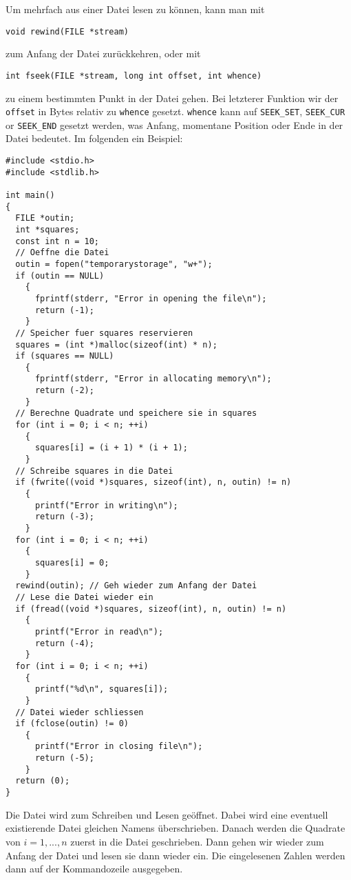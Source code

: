 Um mehrfach aus einer Datei lesen zu können, kann man mit 
\begin{lstlisting}
void rewind(FILE *stream)
\end{lstlisting}
zum Anfang der Datei zurückkehren, oder mit
\begin{lstlisting}
int fseek(FILE *stream, long int offset, int whence)
\end{lstlisting}
zu einem bestimmten Punkt in der Datei gehen.
Bei letzterer Funktion wir der \verb|offset| in Bytes relativ zu \verb|whence| gesetzt.
\verb|whence| kann auf \verb|SEEK_SET|, \verb|SEEK_CUR| or \verb|SEEK_END| gesetzt werden, was Anfang, momentane Position oder Ende in der Datei bedeutet.
Im folgenden ein Beispiel:
\begin{lstlisting}
#include <stdio.h>
#include <stdlib.h>

int main()
{
  FILE *outin;
  int *squares;
  const int n = 10;
  // Oeffne die Datei
  outin = fopen("temporarystorage", "w+");
  if (outin == NULL)
    {
      fprintf(stderr, "Error in opening the file\n");
      return (-1);
    }
  // Speicher fuer squares reservieren
  squares = (int *)malloc(sizeof(int) * n);
  if (squares == NULL)
    {
      fprintf(stderr, "Error in allocating memory\n");
      return (-2);
    }
  // Berechne Quadrate und speichere sie in squares
  for (int i = 0; i < n; ++i)
    {
      squares[i] = (i + 1) * (i + 1);
    }
  // Schreibe squares in die Datei
  if (fwrite((void *)squares, sizeof(int), n, outin) != n)
    {
      printf("Error in writing\n");
      return (-3);
    }
  for (int i = 0; i < n; ++i)
    {
      squares[i] = 0;
    }
  rewind(outin); // Geh wieder zum Anfang der Datei
  // Lese die Datei wieder ein
  if (fread((void *)squares, sizeof(int), n, outin) != n)
    {
      printf("Error in read\n");
      return (-4);
    }
  for (int i = 0; i < n; ++i)
    {
      printf("%d\n", squares[i]);
    }
  // Datei wieder schliessen
  if (fclose(outin) != 0)
    {
      printf("Error in closing file\n");
      return (-5);
    }
  return (0);
}
\end{lstlisting}
Die Datei wird zum Schreiben und Lesen geöffnet.
Dabei wird eine eventuell existierende Datei gleichen Namens überschrieben.
Danach werden die Quadrate von $i=1,...,n$ zuerst in die Datei geschrieben.
Dann gehen wir wieder zum Anfang der Datei und lesen sie dann wieder ein.
Die eingelesenen Zahlen werden dann auf der Kommandozeile ausgegeben.
